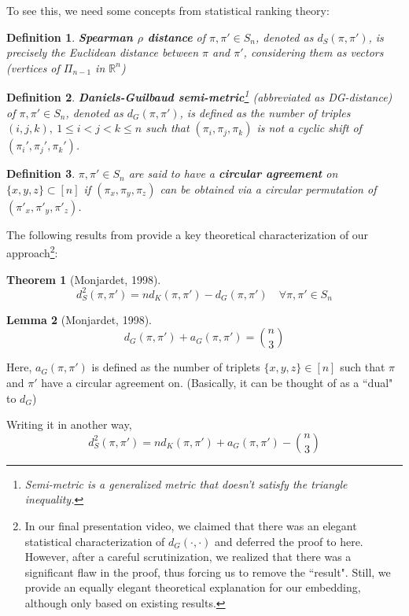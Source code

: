 \documentclass[10pt,journal,compsoc]{IEEEtran}
\newtheorem{definition}{Definition}[section]
\newtheorem{theorem}{Theorem}[section]
\newtheorem{lemma}[theorem]{Lemma}
\begin{document}
	To see this, we need some concepts from statistical ranking theory:
	\begin{definition}
		{\bf Spearman $\rho$ distance} of $\pi, \pi' \in S_n$, denoted as $d_S(\pi, \pi')$, is precisely the Euclidean distance between $\pi$ and $\pi'$, considering them as vectors (vertices of $\Pi_{n-1}$ in $\mathbb{R}^n$)
	\end{definition}
	
	\begin{definition}
		{\bf Daniels-Guilbaud semi-metric}\footnote{Semi-metric is a generalized metric that doesn't satisfy the triangle inequality.} (abbreviated as DG-distance) of $\pi, \pi' \in S_n$, denoted as $d_G(\pi, \pi')$, is defined as the number of triples $(i, j, k), \ 1 \leq i < j < k \leq n$ such that $(\pi_i, \pi_j, \pi_k)$ is not a cyclic shift of $(\pi_i', \pi_j', \pi_k')$.
	\end{definition}
	
	\begin{definition}
		$\pi, \pi' \in S_n$ are said to have a {\bf circular agreement} on $\{x, y, z\} \subset [n]$ if $(\pi_x, \pi_y, \pi_z)$ can be obtained via a circular permutation of $(\pi'_x, \pi'_y, \pi'_z)$.
	\end{definition}
	
	The following results from \cite{Monjardet98} provide a key theoretical characterization of our approach\footnote{In our final presentation video, we claimed that there was an elegant statistical characterization of $d_G(\cdot, \cdot)$ and deferred the proof to here. However, after a careful scrutinization, we realized that there was a significant flaw in the proof, thus forcing us to remove the ``result". Still, we provide an equally elegant theoretical explanation for our embedding, although only based on existing results.}:
	\begin{theorem}[Monjardet, 1998]
		\[ d_S^2(\pi, \pi') = n d_K(\pi, \pi') - d_G(\pi, \pi') \quad \forall \pi, \pi' \in S_n \]
	\end{theorem}
	
	\begin{lemma}[Monjardet, 1998]
		\[ d_G(\pi, \pi') + a_G(\pi, \pi') = \binom{n}{3} \]
	\end{lemma}
	
	Here, $a_G(\pi, \pi')$ is defined as the number of triplets $\{x, y, z\} \in [n]$ such that $\pi$ and $\pi'$ have a circular agreement on.
	(Basically, it can be thought of as a ``dual" to $d_G$)
	
	Writing it in another way, 
	\[ d_S^2(\pi, \pi') = n d_K(\pi, \pi') + a_G(\pi, \pi') - \binom{n}{3} \]
	
\end{document}
